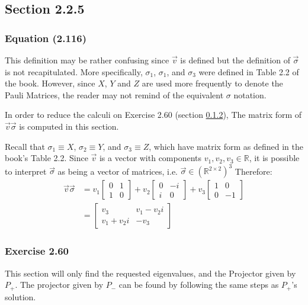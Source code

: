 \subsection{Section 2.2.5}
\subsubsection{Equation (2.116)}
\label{sec:nielsen-and-chuang-equation-2-116}

This definition may be rather confusing since $\vec{v}$ is defined
but the definition of $\vec{\sigma}$ is not recapitulated.
More specifically, $\sigma_1$, $\sigma_1$, and $\sigma_3$ were
defined in Table 2.2 of the book.
However, since $X$, $Y$ and $Z$ are used more frequently to
denote the Pauli Matrices, the reader may not remind of the
equivalent $\sigma$ notation.

In order to reduce the calculi on Exercise 2.60
(section \ref{sec:nielsen-and-chuang-exercise-2-60}),
The matrix form of $\vec{v} \vec{\sigma}$ is computed in this section.

Recall that $\sigma_1 \equiv X$, $\sigma_2 \equiv Y$,
and $\sigma_3 \equiv Z$, which have matrix form as defined in
the book's Table 2.2.
Since $\vec{v}$ is a vector with components
$v_1, v_2, v_3 \in \mathbb{R}$,
it is possible to interpret $\vec{\sigma}$ as being a vector of
matrices, i.e. $\vec{\sigma} \in (\mathbb{R}^{2 \times 2})^3$
Therefore:
%
\begin{align}
    \vec{v} \vec{\sigma} &= v_1 \left[ \begin{matrix}
        0 & 1 \\ 1 & 0 \end{matrix}\right] +
        v_2 \left[ \begin{matrix}
        0 & -i \\ i & 0 \end{matrix} \right] +
        v_3 \left[ \begin{matrix}
        1 & 0 \\ 0 & -1\end{matrix} \right]
        \\
        &= \left[ \begin{matrix}
        v_3 & v_1 -v_2 i \\ v_1 + v_2 i & - v_3
        \end{matrix} \right]
\end{align}

\subsubsection{Exercise 2.60}
\label{sec:nielsen-and-chuang-exercise-2-60}
This section will only find the requested eigenvalues,
and the Projector given by $P_+$.
The projector given by $P_-$ can be found by following the same
steps as $P_+$'s solution.


